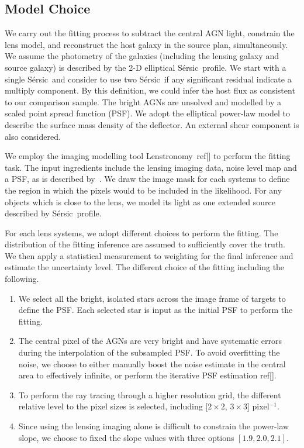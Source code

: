 \documentclass[fleqn,usenatbib]{mnras}
\newcommand{\sersic}{S\'ersic}
\newcommand{\lenstronomy}{{\sc Lenstronomy}}
\begin{document}
\subsection{Model Choice}
We carry out the fitting process to subtract the central AGN light, constrain the lens model, and reconstruct the host galaxy in the source plan, simultaneously.
We assume the photometry of the galaxies (including the lensing galaxy and source galaxy) is described by the 2-D elliptical \sersic\ profile. We start with a single \sersic\ and consider to use two \sersic\ if any significant residual indicate a multiply component. By this definition, we could infer the host flux as consistent to our comparison sample. The bright AGNs are unsolved and modelled by a scaled point spread function (PSF). We adopt the elliptical power-law model to describe the surface mass density of the deflector. An external shear component is also considered.

We employ the imaging modelling tool \lenstronomy~ref[] to perform the fitting task. The input ingredients include the lensing imaging data, noise level map and a PSF, as is described by~\citet{Ding2020}. We draw the image mask for each systems to define the region in which the pixels would to be included in the likelihood. For any objects which is close to the lens, we model its light as one extended source described by \sersic\ profile. 

For each lens systems, we adopt different choices to perform the fitting. The distribution of the fitting inference are assumed to sufficiently cover the truth. We then apply a statistical measurement to weighting for the final inference and estimate the uncertainty level. The different choice of the fitting including the following.
\begin{enumerate}
\item  We select all the bright, isolated stars across the image frame of targets to define the PSF. Each selected star is input as the initial PSF to perform the fitting.
\item The central pixel of the AGNs are very bright and have systematic errors during the interpolation of the subsampled PSF. To avoid overfitting the noise, we choose to either manually boost the noise estimate in the central area to effectively infinite, or perform the iterative PSF estimation ref[].
\item To perform the ray tracing through a higher resolution grid, the different relative level to the pixel sizes is selected, including [$2\times2$, $3\times3$] pixel$^{-1}$.
\item Since using the lensing imaging alone is difficult to constrain the power-law slope, we choose to fixed the slope values with three options $[1.9, 2.0, 2.1]$.
\end{enumerate}
\end{document}
